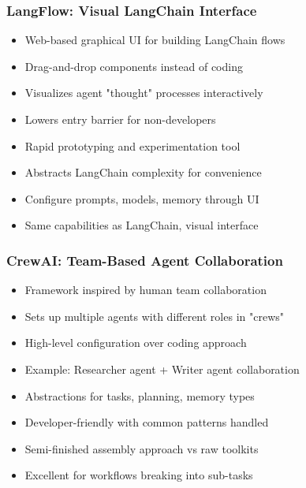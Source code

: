 \begin{frame}[fragile]\frametitle{LangFlow: Visual LangChain Interface}
      \begin{itemize}
	  \item Web-based graphical UI for building LangChain flows
	  \item Drag-and-drop components instead of coding
	  \item Visualizes agent "thought" processes interactively
	  \item Lowers entry barrier for non-developers
	  \item Rapid prototyping and experimentation tool
	  \item Abstracts LangChain complexity for convenience
	  \item Configure prompts, models, memory through UI
	  \item Same capabilities as LangChain, visual interface
	  \end{itemize}
\end{frame}

\begin{frame}[fragile]\frametitle{CrewAI: Team-Based Agent Collaboration}
      \begin{itemize}
	  \item Framework inspired by human team collaboration
	  \item Sets up multiple agents with different roles in "crews"
	  \item High-level configuration over coding approach
	  \item Example: Researcher agent + Writer agent collaboration
	  \item Abstractions for tasks, planning, memory types
	  \item Developer-friendly with common patterns handled
	  \item Semi-finished assembly approach vs raw toolkits
	  \item Excellent for workflows breaking into sub-tasks
	  \end{itemize}
\end{frame}




